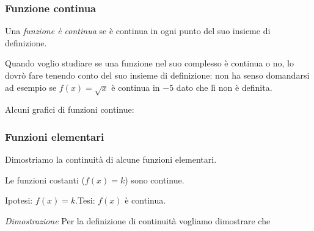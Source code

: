 \subsubsection{Funzione continua}
\label{subsubsec:cont_funzionecontinua}

\begin{definizione}
Una \emph{funzione è continua} se è continua in ogni punto del suo 
insieme di definizione.
\end{definizione}

Quando voglio studiare se una funzione nel suo complesso è continua o no, lo 
dovrò fare tenendo conto del suo insieme di definizione: non ha senso 
domandarsi ad esempio se \(f(x) = \sqrt{x}\) è continua in \(-5\) dato che lì 
non è definita.

Alcuni grafici di funzioni continue:

\hspace{-12mm}\begin{minipage}{.32\textwidth}
\begin{center} \scalebox{.9}{\contsecondoa} \end{center}
\end{minipage}
\hfill
\begin{minipage}{.32\textwidth}
\begin{center} \contrad \end{center}
\end{minipage}
\hfill
\begin{minipage}{.32\textwidth}
\begin{center} \contip \end{center}
\end{minipage}


\subsubsection{Funzioni elementari}
\label{subsubsec:cont_funzionielementari}

Dimostriamo la continuità di alcune funzioni elementari.

\begin{teorema}
Le funzioni costanti (\(f(x) = k\)) sono continue.
\end{teorema}

Ipotesi: \(f(x)=k\).\tab Tesi: \(f(x)\) è continua.


\noindent \emph{Dimostrazione}
Per la definizione di continuità vogliamo dimostrare che 

